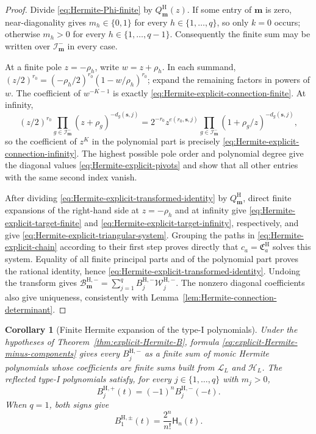 \documentclass[10pt]{amsart}
\newcommand{\mm}{\boldsymbol m}
\theoremstyle{plain}
\newtheorem{corollary}[theorem]{Corollary}
\theoremstyle{definition}
\theoremstyle{remark}
\begin{document}
\begin{proof}
Divide \eqref{eq:Hermite-Phi-finite} by \(Q_{\mm}^{\mathrm H}(z)\). If
some entry of \(\mm\) is zero, near-diagonality gives
\(m_h\in\{0,1\}\) for every \(h\in\{1,\ldots,q\}\), so only \(k=0\)
occurs; otherwise \(m_h>0\) for every
\(h\in\{1,\ldots,q-1\}\).
Consequently the finite sum may be written over
\(\mathcal I_{\mm}^-\) in every case.

At a finite pole \(z=-\rho_h\), write \(w=z+\rho_h\). In each summand,
\((z/2)^{r_0}=(-\rho_h/2)^{r_0}(1-w/\rho_h)^{r_0}\); expand the
remaining factors in powers of \(w\).
The coefficient of \(w^{-K-1}\) is exactly
\eqref{eq:Hermite-explicit-connection-finite}.  At infinity,
\[
 (z/2)^{r_0}\prod_{g\in\mathcal I_{\mm}^-}
 (z+\rho_g)^{-d_g(\boldsymbol s,j)}
 =2^{-r_0}z^{e(r_0,\boldsymbol s,j)}
  \prod_{g\in\mathcal I_{\mm}^-}
  (1+\rho_g/z)^{-d_g(\boldsymbol s,j)},
\]
so the coefficient of \(z^K\) in the polynomial part is precisely
\eqref{eq:Hermite-explicit-connection-infinity}.  The highest possible
pole order and polynomial degree give the diagonal values
\eqref{eq:Hermite-explicit-pivots} and show that all other entries with
the same second index vanish.

After dividing \eqref{eq:Hermite-explicit-transformed-identity} by
\(Q_{\mm}^{\mathrm H}\), direct finite expansions of the right-hand side
at \(z=-\rho_h\) and at infinity give
\eqref{eq:Hermite-explicit-target-finite} and
\eqref{eq:Hermite-explicit-target-infinity}, respectively, and give
\eqref{eq:Hermite-explicit-triangular-system}. Grouping the paths in
\eqref{eq:Hermite-explicit-chain} according to their first step proves
directly that
\(c_a=\mathfrak C_a^{\mathrm H}\) solves this system.  Equality of all
finite principal parts and of the polynomial part proves the rational
identity, hence \eqref{eq:Hermite-explicit-transformed-identity}.
Undoing the transform gives
\(\mathcal B_{\mm}^{\mathrm H,-}
=\sum_{j=1}^qB_j^{\mathrm H,-}\mathcal W_j^{\mathrm H,-}\).
The nonzero diagonal coefficients also give uniqueness, consistently with
Lemma~\ref{lem:Hermite-connection-determinant}.
\end{proof}

\begin{corollary}[Finite Hermite expansion of the type-I polynomials]
\label{cor:Hermite-explicit-components}
Under the hypotheses of Theorem~\ref{thm:explicit-Hermite-B},
formula \eqref{eq:explicit-Hermite-minus-components} gives every
\(B_j^{\mathrm H,-}\) as a finite sum of monic Hermite polynomials whose
coefficients are finite sums built from \(\mathscr L_L\) and
\(\mathscr H_L\). The reflected type-I polynomials satisfy, for every
\(j\in\{1,\ldots,q\}\) with \(m_j>0\),
\begin{equation}
 B_j^{\mathrm H,+}(t)=(-1)^nB_j^{\mathrm H,-}(-t).
 \label{eq:Hermite-B-component-reflection}
\end{equation}
When \(q=1\), both signs give
\begin{equation}
 B_1^{\mathrm H,\pm}(t)=\frac{2^n}{n!}\mathsf H_n(t).
 \label{eq:Hermite-scalar-component}
\end{equation}
\end{corollary}
\end{document}

